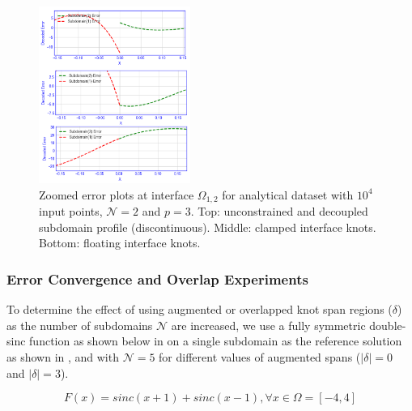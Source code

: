 \begin{figure}[htbp]
	\centering
	\includegraphics[width=0.44\textwidth]{figures/1d-error-comparison}
	\caption{Zoomed error plots at interface $\Omega_{1,2}$ for  analytical dataset with $10^4$ input points, $\mathcal{N}=2$ and $p=3$.  Top: unconstrained and decoupled subdomain profile (discontinuous). Middle: clamped interface knots. Bottom: floating interface knots.}
	\label{fig:1d-error-comparison}
\end{figure}

%

\subsubsection{Error Convergence and Overlap Experiments}

To determine the effect of using augmented or overlapped knot span regions ($\delta$) as the number of subdomains $\mathcal{N}$ are increased, we use a fully symmetric double-sinc function as shown below in  on a single subdomain as the reference solution as shown in , and with $\mathcal{N}=5$ for different values of augmented spans ($\left| \delta \right|=0$ and $\left| \delta \right|=3$).


\begin{equation}
	F(x) = sinc(x+1) + sinc(x-1), \forall x \in \Omega=[-4, 4]
	\label{eqn:1d-symmetric-sinc}
\end{equation}


